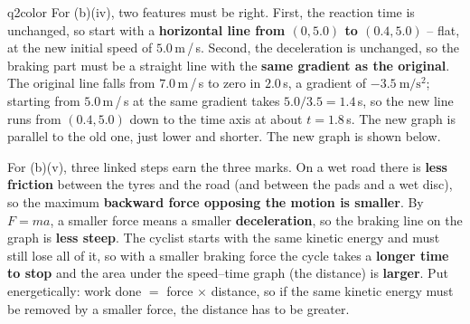 \documentclass[11pt,a4paper]{article}
\begin{document}
\begin{ansbox}{q2color}
For (b)(iv), two features must be right. First, the reaction time is unchanged, so start with a \textbf{horizontal line from $(0, 5.0)$ to $(0.4, 5.0)$} -- flat, at the new initial speed of $5.0$\,m\,/\,s. Second, the deceleration is unchanged, so the braking part must be a straight line with the \textbf{same gradient as the original}. The original line falls from $7.0$\,m\,/\,s to zero in $2.0$\,s, a gradient of $-3.5\ \mathrm{m/s^2}$; starting from $5.0$\,m\,/\,s at the same gradient takes $5.0/3.5 = 1.4$\,s, so the new line runs from $(0.4, 5.0)$ down to the time axis at about $t = 1.8$\,s. The new graph is parallel to the old one, just lower and shorter. The new graph is shown below.
\begin{center}
\end{center}

For (b)(v), three linked steps earn the three marks. On a wet road there is \textbf{less friction} between the tyres and the road (and between the pads and a wet disc), so the maximum \textbf{backward force opposing the motion is smaller}. By $F = ma$, a smaller force means a smaller \textbf{deceleration}, so the braking line on the graph is \textbf{less steep}. The cyclist starts with the same kinetic energy and must still lose all of it, so with a smaller braking force the cycle takes a \textbf{longer time to stop} and the area under the speed--time graph (the distance) is \textbf{larger}. Put energetically: work done $= $ force $\times$ distance, so if the same kinetic energy must be removed by a smaller force, the distance has to be greater.


\end{ansbox}
\end{document}
